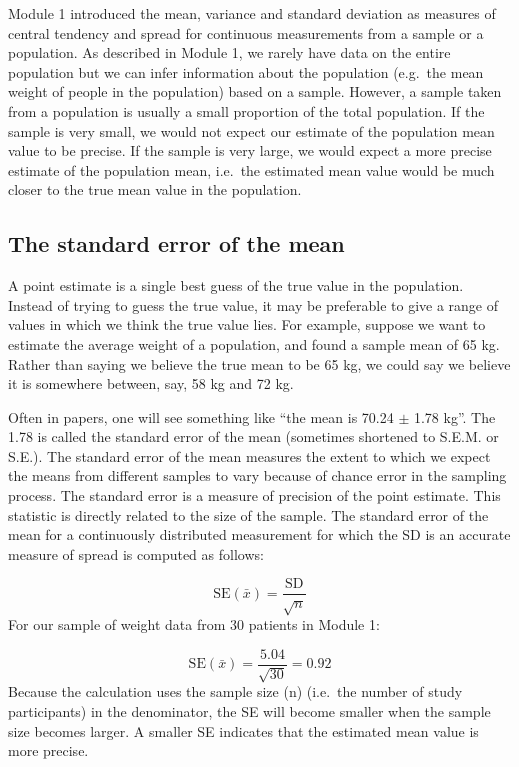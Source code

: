 \documentclass[
]{memoir}
\begin{document}
Module 1 introduced the mean, variance and standard deviation as measures of central tendency and spread for continuous measurements from a sample or a population. As described in Module 1, we rarely have data on the entire population but we can infer information about the population (e.g.~the mean weight of people in the population) based on a sample. However, a sample taken from a population is usually a small proportion of the total population. If the sample is very small, we would not expect our estimate of the population mean value to be precise. If the sample is very large, we would expect a more precise estimate of the population mean, i.e.~the estimated mean value would be much closer to the true mean value in the population.

\hypertarget{the-standard-error-of-the-mean}{%
\subsection{The standard error of the mean}\label{the-standard-error-of-the-mean}}

A point estimate is a single best guess of the true value in the population. Instead of trying to guess the true value, it may be preferable to give a range of values in which we think the true value lies. For example, suppose we want to estimate the average weight of a population, and found a sample mean of 65 kg. Rather than saying we believe the true mean to be 65 kg, we could say we believe it is somewhere between, say, 58 kg and 72 kg.

Often in papers, one will see something like ``the mean is 70.24 \(\pm\) 1.78 kg''. The 1.78 is called the standard error of the mean (sometimes shortened to S.E.M. or S.E.). The standard error of the mean measures the extent to which we expect the means from different samples to vary because of chance error in the sampling process. The standard error is a measure of precision of the point estimate. This statistic is directly related to the size of the sample. The standard error of the mean for a continuously distributed measurement for which the SD is an accurate measure of spread is computed as follows:

\[ \text{SE}(\bar{x}) = \frac{\text{SD}}{\sqrt{n}} \]
For our sample of weight data from 30 patients in Module 1:

\[ \text{SE}(\bar{x}) = \frac{\text{5.04}}{\sqrt{30}} = 0.92 \]
Because the calculation uses the sample size (n) (i.e.~the number of study participants) in the denominator, the SE will become smaller when the sample size becomes larger. A smaller SE indicates that the estimated mean value is more precise.
\end{document}
